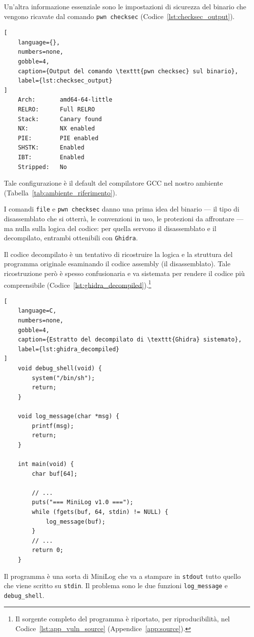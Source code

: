 Un'altra informazione essenziale sono le impostazioni di sicurezza del binario che vengono ricavate dal comando \texttt{pwn checksec} (Codice~\ref{lst:checksec_output}).
\begin{lstlisting}[
    language={},
    numbers=none,
    gobble=4,
    caption={Output del comando \texttt{pwn checksec} sul binario},
    label={lst:checksec_output}
]
    Arch:       amd64-64-little
    RELRO:      Full RELRO
    Stack:      Canary found
    NX:         NX enabled
    PIE:        PIE enabled
    SHSTK:      Enabled
    IBT:        Enabled
    Stripped:   No
\end{lstlisting}
Tale configurazione è il default del compilatore GCC nel nostro ambiente (Tabella~\ref{tab:ambiente_riferimento}).

I comandi \texttt{file} e \texttt{pwn checksec} danno una prima idea del binario --- il tipo di disassemblato che si otterrà, le convenzioni in uso, le protezioni da affrontare --- ma nulla sulla logica del codice: per quella servono il disassemblato e il decompilato, entrambi ottenibili con \texttt{Ghidra}.

Il codice decompilato è un tentativo di ricostruire la logica e la struttura del programma originale esaminando il codice assembly (il disassemblato). Tale ricostruzione però è spesso confusionaria e va sistemata per rendere il codice più comprensibile (Codice~\ref{lst:ghidra_decompiled}).\footnote{Il sorgente completo del programma è riportato, per riproducibilità, nel Codice~\ref{lst:app_vuln_source} (Appendice~\ref{app:source}).}
\begin{lstlisting}[
    language=C,
    numbers=none,
    gobble=4,
    caption={Estratto del decompilato di \texttt{Ghidra} sistemato},
    label={lst:ghidra_decompiled}
]
    void debug_shell(void) {
        system("/bin/sh");
        return;
    }

    void log_message(char *msg) {
        printf(msg);
        return;
    }

    int main(void) {
        char buf[64];

        // ...
        puts("=== MiniLog v1.0 ===");
        while (fgets(buf, 64, stdin) != NULL) {
            log_message(buf);
        }
        // ...
        return 0;
    }
\end{lstlisting}
Il programma è una sorta di MiniLog che va a stampare in \texttt{stdout} tutto quello che viene scritto su \texttt{stdin}. Il problema sono le due funzioni \texttt{log\_message} e \texttt{debug\_shell}.

